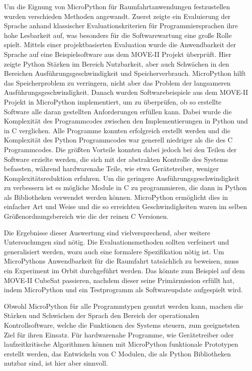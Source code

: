 Um die Eignung von MicroPython für Raumfahrtanwendungen festzustellen wurden verschieden Methoden angewandt. Zuerst zeigte ein Evaluierung der Sprache anhand klassischer Evaluationskriterien für Programmiersprachen ihre hohe Lesbarkeit auf, was besonders für die Softwarewartung eine große Rolle spielt. Mittels einer projektbasierten Evaluation wurde die Anwendbarkeit der Sprache auf eine Beispielsoftware aus dem MOVE-II Projekt überprüft. Hier zeigte Python Stärken im Bereich Nutzbarkeit, aber auch Schwächen in den Bereichen Ausführungsgeschwindigkeit und Speicherverbrauch. MicroPython hilft das Speicherproblem zu verringern, nicht aber das Problem der langsameren Ausführungsgeschwindigkeit. Danach wurden Softwarebeispiele aus dem MOVE-II Projekt in MicroPython implementiert, um zu überprüfen, ob so erstellte Software alle daran gestellten Anforderungen erfüllen kann. Dabei wurde die Komplexität des Programmcodes zwischen den Implementierungen in Python und in C verglichen. Alle Programme konnten erfolgreich erstellt werden und die Komplexität des Python Programmcodes war generell niedriger als die des C Programmcodes. Die größten Vorteile konnten dabei jedoch bei den Teilen der Software erzielte werden, die sich mit der abstrakten Kontrolle des Systems befassten, während hardwarenahe Teile, wie etwa Gerätetreiber, weniger Komplexitätsreduktion erfuhren. Um die geringere Ausführungsgeschwindigkeit zu verbessern ist es mögliche Module in C zu programmieren, die dann in Python als Bibliotheken verwendet werden können. MicroPython ermöglicht dies in einfacher Art und Weise und die so erreichten Geschwindigkeiten waren im selben Größenordnungsbereich wie die der reinen C Versionen.

Die Ergebnisse dieser Auswertung sind vielversprechend, aber weitere Untersuchungen sind nötig. Die Evaluationsmethoden sollten verfeinert und generalisiert werden, wozu auch eine formalere Spezifikation nötig ist. Um MicroPythons Anwendbarkeit für die Raumfahrt tatsächlich zu beweisen, muss ein Experiment im Orbit durchgeführt werden. Das könnte zum Beispiel auf dem MOVE-II CubeSat passieren, nachdem dieser seine Primärmission erfüllt hat, indem MicroPython und ein Testprogramm als Softwareupdate aufgespielt wird.

Obwohl MicroPython für alle Programmtypen genutzt werden kann, machen die Stärken und Schwächen der Sprach den Bereich der operationalen Kontrollsoftware, welche die Funktionen des Systems steuern, zum geeignetsten Ziel für ihren Einsatz. Für hardwarenahe Programme, wie Gerätetreiber oder laufzeitkritische Algorithmen können mit MicroPython funktionale Prototypen erstellt werden, das Entwickeln von C Modulen, die als Python Bibliotheken nutzbar sind, ist hier aber sinnvoll.
